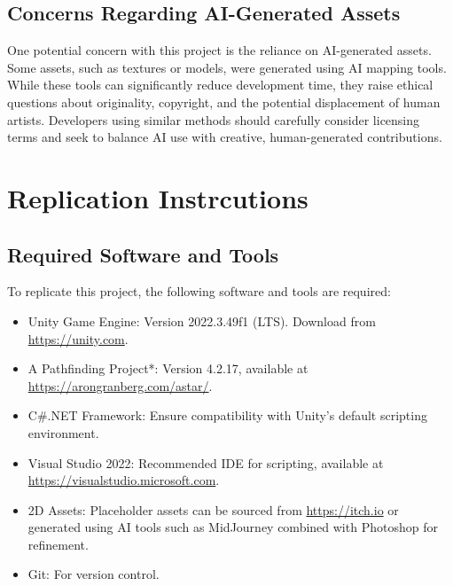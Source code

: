 \documentclass[10pt,twocolumn]{article}
\begin{document}
\subsection{Concerns Regarding AI-Generated Assets} One potential concern with this project is the reliance on AI-generated assets. Some assets, such as textures or models, were generated using AI mapping tools. While these tools can significantly reduce development time, they raise ethical questions about originality, copyright, and the potential displacement of human artists. Developers using similar methods should carefully consider licensing terms and seek to balance AI use with creative, human-generated contributions.

\section{Replication Instrcutions}
\subsection{Required Software and Tools} To replicate this project, the following software and tools are required: 
\begin{itemize} 
    \item Unity Game Engine: Version 2022.3.49f1 (LTS). Download from \url{https://unity.com}. 
    \item A Pathfinding Project*: Version 4.2.17, available at \url{https://arongranberg.com/astar/}. 
    \item C\#.NET Framework: Ensure compatibility with Unity’s default scripting environment. 
    \item Visual Studio 2022: Recommended IDE for scripting, available at \url{https://visualstudio.microsoft.com}. 
    \item 2D Assets: Placeholder assets can be sourced from \url{https://itch.io} or generated using AI tools such as MidJourney combined with Photoshop for refinement. 
    \item Git: For version control. 
\end{itemize}
\end{document}
